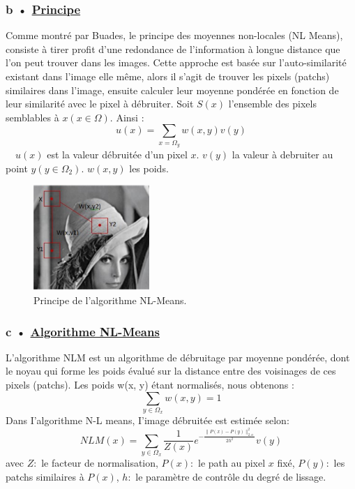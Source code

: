 \documentclass[12pt,a4paper]{report}
\numberwithin{equation}{subsection}
\numberwithin{equation}{section}
\begin{document}
\subsubsection{b • \underline {Principe}}
Comme montré par Buades, le principe des moyennes non-locales
(NL Means), consiste à tirer profit d’une redondance de l’information à longue distance que l’on peut trouver dans les images. Cette approche est basée sur l’auto-similarité existant dans l’image elle même, alors il s’agit de trouver les pixels (patchs) similaires dans l’image, ensuite calculer leur moyenne pondérée en fonction de leur similarité avec
le pixel à débruiter. \newline
Soit $S(x)$  l’ensemble des pixels semblables à $x(x \in \Omega)$. Ainsi :
$$
u(x)=\sum_{x=\Omega_{y}} w(x, y) v(y)
$$
\newline
$\quad u(x)$ est la valeur débruitée d'un pixel $x$.\newline
$v(y)$ la valeur à debruiter au point $y\left(y \in \Omega_{2}\right)$.\newline
$w(x, y)$ les poids.\newline
\begin{figure}[h!]
    \centering
    \includegraphics[height=4cm , width=.3\textwidth]{NLmeans.jpg}
     \caption{Principe de l’algorithme NL-Means.}
\end{figure}
\subsubsection{c • \underline {Algorithme NL-Means}}
L’algorithme NLM est un algorithme de débruitage par moyenne
pondérée, dont le noyau qui forme les poids évalué sur la distance entre des voisinages de ces pixels (patchs). Les poids w(x, y) étant normalisés, nous obtenons :
\newline
$$\sum_{y \in \Omega_{x}} w(x, y)=1$$\newline
Dans I'algorithme N-L means, I'image débruitée est estimée selon:
\newline
$$N L M(x)=\sum_{y \in \Omega_{x}} \frac{1}{Z(x)} e^{-\frac{\| P(x)-P(y) \|_{2, a}^{2}}{2 h^{2}}} v(y)$$
\newline
avec
\newline
$Z:$ le facteur de normalisation,
\newline
$P(x):$ le path au pixel $x$ fixé,
\newline $P(y):$ les patchs similaires à $P(x)$,\newline
$h:$ le paramètre de contrôle du degré de lissage.\newline
\end{document}
